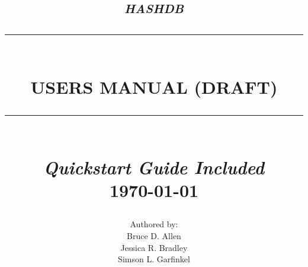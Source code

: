 \begin{titlepage}





%



\newcommand{\TRule}[1]{\rule{\linewidth}{#1}} 	%

\makeatletter							%
\def\printtitle{%
    {\centering \@title\par}}
\makeatother									

\makeatletter							%
\def\printauthor{%
    {\centering \large \@author}}				
\makeatother							

\title{	\LARGE \textsc{\textit{hashdb}} 	%
		 	\\[1.0cm]													%
			\TRule{0.5pt} \\										%
			\LARGE \textbf{\uppercase{Users Manual (DRAFT)}}	%
			\TRule{2pt} \\ [0.5cm]								%
			\small \textit{Quickstart Guide Included}\\
			\normalsize \today									%
		}
\author{
		Authored by: \\
		Bruce D. Allen\\
		Jessica R. Bradley\\
		Simson L. Garfinkel\\		
}

\thispagestyle{empty}				%

\printtitle									%
  	\vfill
\printauthor								%














\end{titlepage}
